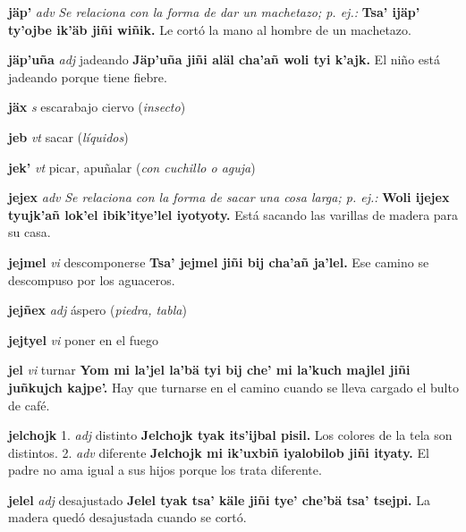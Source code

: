 \documentclass[10pt]{scrbook}
\newcommand{\entry}[1]{\textbf{#1}}
\newcommand{\onedefinition}[1]{#1.}
\newcommand{\nontranslationdef}[1]{\textit{#1}}
\newcommand{\partofspeech}[1]{\textit{#1}}
\newcommand{\spanishtranslation}[1]{#1}
\newcommand{\clarification}[1]{(\textit{#1})}
\newcommand{\cholexample}[1]{\textbf{#1}}
\newcommand{\exampletranslation}[1]{#1}
\begin{document}
\begin{multicols}{2}
\entry{jäp'}
\partofspeech{adv}
\nontranslationdef{Se relaciona con la forma de dar un machetazo; p. ej.:}
\cholexample{Tsa' ijäp' ty'ojbe ik'äb jiñi wiñik.}
\exampletranslation{Le cortó la mano al hombre de un machetazo.}

\entry{jäp'uña}
\partofspeech{adj}
\spanishtranslation{jadeando}
\cholexample{Jäp'uña jiñi aläl cha'añ woli tyi k'ajk.}
\exampletranslation{El niño está jadeando porque tiene fiebre.}

\entry{jäx}
\partofspeech{s}
\spanishtranslation{escarabajo ciervo}
\clarification{insecto}

\entry{jeb}
\partofspeech{vt}
\spanishtranslation{sacar}
\clarification{líquidos}

\entry{jek'}
\partofspeech{vt}
\spanishtranslation{picar, apuñalar}
\clarification{con cuchillo o aguja}

\entry{jejex}
\partofspeech{adv}
\nontranslationdef{Se relaciona con la forma de sacar una cosa larga; p. ej.:}
\cholexample{Woli ijejex tyujk'añ lok'el ibik'itye'lel iyotyoty.}
\exampletranslation{Está sacando las varillas de madera para su casa.}

\entry{jejmel}
\partofspeech{vi}
\spanishtranslation{descomponerse}
\cholexample{Tsa' jejmel jiñi bij cha'añ ja'lel.}
\exampletranslation{Ese camino se descompuso por los aguaceros.}

\entry{jejñex}
\partofspeech{adj}
\spanishtranslation{áspero}
\clarification{piedra, tabla}

\entry{jejtyel}
\partofspeech{vi}
\spanishtranslation{poner en el fuego}

\entry{jel}
\partofspeech{vi}
\spanishtranslation{turnar}
\cholexample{Yom mi la'jel la'bä tyi bij che' mi la'kuch majlel jiñi juñkujch kajpe'.}
\exampletranslation{Hay que turnarse en el camino cuando se lleva cargado el bulto de café.}

\entry{jelchojk}
\onedefinition{1}
\partofspeech{adj}
\spanishtranslation{distinto}
\cholexample{Jelchojk tyak its'ijbal pisil.}
\exampletranslation{Los colores de la tela son distintos.}
\onedefinition{2}
\partofspeech{adv}
\spanishtranslation{diferente}
\cholexample{Jelchojk mi ik'uxbiñ iyalobilob jiñi ityaty.}
\exampletranslation{El padre no ama igual a sus hijos porque los trata diferente.}

\entry{jelel}
\partofspeech{adj}
\spanishtranslation{desajustado}
\cholexample{Jelel tyak tsa' käle jiñi tye' che'bä tsa' tsejpi.}
\exampletranslation{La madera quedó desajustada cuando se cortó.}


\end{multicols}
\end{document}
